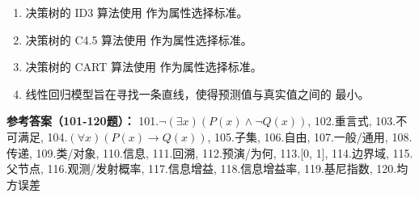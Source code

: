 \begin{enumerate}[resume,leftmargin=2em,itemsep=1pt]
\item 决策树的 ID3 算法使用 \underline{\hspace{3em}} 作为属性选择标准。
\item 决策树的 C4.5 算法使用 \underline{\hspace{3em}} 作为属性选择标准。
\item 决策树的 CART 算法使用 \underline{\hspace{3em}} 作为属性选择标准。
\item 线性回归模型旨在寻找一条直线，使得预测值与真实值之间的 \underline{\hspace{3em}} 最小。
\end{enumerate}

\textbf{参考答案（101-120题）：}
101.$\neg (\exists x)(P(x) \land \neg Q(x))$, 102.重言式, 103.不可满足, 104.$(\forall x)(P(x) \to Q(x))$, 105.子集, 106.自由, 107.一般/通用, 108.传递, 109.类/对象, 110.信息, 111.回溯, 112.预演/为何, 113.[0, 1], 114.边界域, 115.父节点, 116.观测/发射概率, 117.信息增益, 118.信息增益率, 119.基尼指数, 120.均方误差

